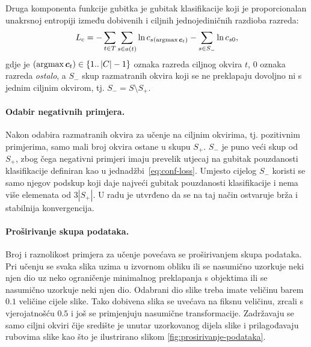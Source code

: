 \documentclass[utf8, seminar, numeric, lmodern]{feri}
\begin{document}
Druga komponenta funkcije gubitka je gubitak klasifikacije koji je proporcionalan unakrsnoj entropiji između dobivenih i ciljnih jednojediničnih razdioba razreda:
\begin{equation} \label{eq:conf-loss}
L_\mathrm{c} = -\sum_{t \in T}\sum_{s\in a(t)}\ln c_{s(\arg\!\max\bm{c}_t)} 
-\sum_{s\in S_-}\ln c_{s0},
\end{equation}
gdje je $(\arg\!\max\bm{c}_t) \in \{1 ..\left|C\right|-1\}$ oznaka razreda ciljnog okvira $t$, $0$ oznaka razreda \emph{ostalo}, a $S_-$ skup razmatranih okvira koji se ne preklapaju dovoljno ni s jednim ciljnim okvirom, tj. $S_- = S\setminus S_+$.

\paragraph{Odabir negativnih primjera.} Nakon odabira razmatranih okvira za učenje na ciljnim okvirima, tj. pozitivnim primjerima, samo mali broj okvira ostane u skupu $S_+$. $S_-$ je puno veći skup od $S_+$, zbog čega negativni primjeri imaju prevelik utjecaj na gubitak pouzdanosti klasifikacije definiran kao u jednadžbi~\ref{eq:conf-loss}. Umjesto cijelog $S_-$ koristi se samo njegov podskup koji daje najveći gubitak pouzdanosti klasifikacije i nema više elemenata od $3\left|S_+\right|$. U radu je utvrđeno da se na taj način ostvaruje brža i stabilnija konvergencija.

\paragraph{Proširivanje skupa podataka.}
Broj i raznolikost primjera za učenje povećava se proširivanjem skupa podataka. Pri učenju se svaka slika uzima u izvornom obliku ili se nasumično uzorkuje neki njen dio uz neko ograničenje minimalnog preklapanja s objektima ili se nasumično uzorkuje neki njen dio. Odabrani dio slike treba imate veličinu barem $0.1$ veličine cijele slike. Tako dobivena slika se uvećava na fiksnu veličinu, zrcali s vjerojatnošću $0.5$ i još se primjenjuju nasumične transformacije. Zadržavaju se samo ciljni okviri čije središte je unutar uzorkovanog dijela slike i prilagođavaju rubovima slike kao što je ilustrirano slikom \ref{fig:prosirivanje-podataka}.
\end{document}
